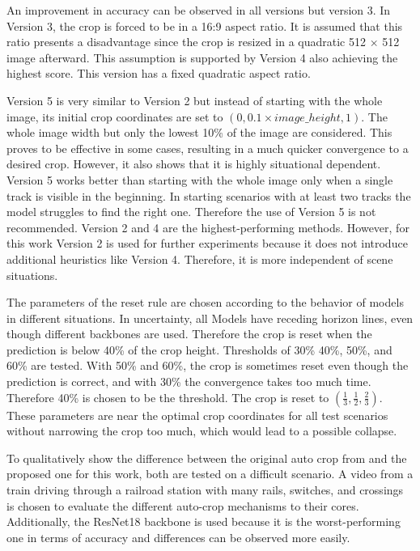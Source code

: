 An improvement in accuracy can be observed in all versions but version 3.
In Version 3, the crop is forced to be in a 16:9 aspect ratio.
It is assumed that this ratio presents a disadvantage since the crop is resized in a quadratic 512 $\times$ 512 image afterward.
This assumption is supported by Version 4 also achieving the highest score.
This version has a fixed quadratic aspect ratio.

Version 5 is very similar to Version 2 but instead of starting with the whole image, its initial crop coordinates are set to $(0, 0.1 \times image\_height, 1)$.
The whole image width but only the lowest 10\% of the image are considered.
This proves to be effective in some cases, resulting in a much quicker convergence to a desired crop.
However, it also shows that it is highly situational dependent.
Version 5 works better than starting with the whole image only when a single track is visible in the beginning.
In starting scenarios with at least two tracks the model struggles to find the right one. Therefore the use of Version 5 is not recommended.
Version 2 and 4 are the highest-performing methods.
However, for this work Version 2 is used for further experiments because it does not introduce additional heuristics like Version 4.
Therefore, it is more independent of scene situations.

The parameters of the reset rule are chosen according to the behavior of models in different situations.
In uncertainty, all Models have receding horizon lines, even though different backbones are used.
Therefore the crop is reset when the prediction is below 40\% of the crop height.
Thresholds of 30\% 40\%, 50\%, and 60\% are tested.
With 50\% and 60\%, the crop is sometimes reset even though the prediction is correct, and with 30\% the convergence takes too much time.
Therefore 40\% is chosen to be the threshold.
The crop is reset to $(\frac{1}{3}, \frac{1}{2}, \frac{2}{3})$.
These parameters are near the optimal crop coordinates for all test scenarios without narrowing the crop too much, which would lead to a possible collapse.

\vspace{1cm}

To qualitatively show the difference between the original auto crop from \cite{tepNet2024} and the proposed one for this work, both are tested on a difficult scenario.
A video from a train driving through a railroad station with many rails, switches, and crossings is chosen to evaluate the different auto-crop mechanisms to their cores.
Additionally, the ResNet18 backbone is used because it is the worst-performing one in terms of accuracy and differences can be observed more easily.


